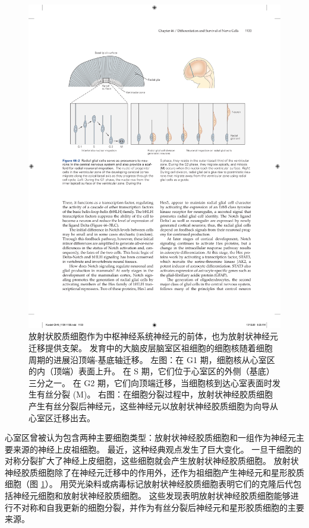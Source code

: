 \begin{figure}[htbp]
	\centering
	\includegraphics[width=0.9\linewidth]{chap46/fig_46_2}
	\caption{放射状胶质细胞作为中枢神经系统神经元的前体，也为放射状神经元迁移提供支架。 发育中的大脑皮层脑室区祖细胞的细胞核随着细胞周期的进展沿顶端-基底轴迁移。 左图：在 G1 期，细胞核从心室区的内（顶端）表面上升。 在 S 期，它们位于心室区的外侧（基底）三分之一。 在 G2 期，它们向顶端迁移，当细胞核到达心室表面时发生有丝分裂 (M)。 右图：在细胞分裂过程中，放射状神经胶质细胞产生有丝分裂后神经元，这些神经元以放射状神经胶质细胞为向导从心室区迁移出去。}
	\label{fig:46_2}
\end{figure}

心室区曾被认为包含两种主要细胞类型：放射状神经胶质细胞和一组作为神经元主要来源的神经上皮祖细胞。 最近，这种经典观点发生了巨大变化。 一旦干细胞的对称分裂扩大了神经上皮细胞，这些细胞就会产生放射状神经胶质细胞。 放射状神经胶质细胞除了在神经元迁移中的作用外，还作为祖细胞产生神经元和星形胶质细胞（图 \ref{fig:46_2}）。 用荧光染料或病毒标记放射状神经胶质细胞表明它们的克隆后代包括神经元细胞和放射状神经胶质细胞。 这些发现表明放射状神经胶质细胞能够进行不对称和自我更新的细胞分裂，并作为有丝分裂后神经元和星形胶质细胞的主要来源。


